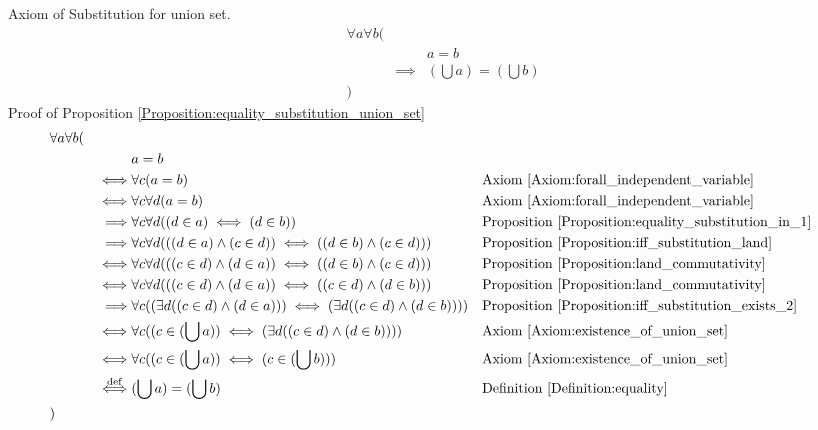 \begin{prop}
\label{Proposition:equality_substitution_union_set}
Axiom of Substitution for union set.
\begin{align*}
& \forall a \forall b ( \\
& & & a = b \\
& & \implies & (\bigcup a) = (\bigcup b) \\
& )
\end{align*}
Proof of Proposition \ref{Proposition:equality_substitution_union_set}
\begin{align*}
& \forall a \forall b ( \\
& & & a = b \\
& & \iff & \forall c (a = b)
& & \text{Axiom \ref{Axiom:forall_independent_variable}} \\
& & \iff & \forall c \forall d (a = b)
& & \text{Axiom \ref{Axiom:forall_independent_variable}} \\
& & \implies & \forall c \forall d ((d \in a) \iff (d \in b))
& & \text{Proposition \ref{Proposition:equality_substitution_in_1}} \\
& & \implies & \forall c \forall d (((d \in a) \land (c \in d)) \iff ((d \in b) \land (c \in d)))
& & \text{Proposition \ref{Proposition:iff_substitution_land}} \\
& & \iff & \forall c \forall d (((c \in d) \land (d \in a)) \iff ((d \in b) \land (c \in d)))
& & \text{Proposition \ref{Proposition:land_commutativity}} \\
& & \iff & \forall c \forall d (((c \in d) \land (d \in a)) \iff ((c \in d) \land (d \in b)))
& & \text{Proposition \ref{Proposition:land_commutativity}} \\
& & \implies & \forall c ((\exists d ((c \in d) \land (d \in a))) \iff (\exists d ((c \in d) \land (d \in b))))
& & \text{Proposition \ref{Proposition:iff_substitution_exists_2}} \\
& & \iff & \forall c ((c \in (\bigcup a)) \iff (\exists d ((c \in d) \land (d \in b))))
& & \text{Axiom \ref{Axiom:existence_of_union_set}} \\
& & \iff & \forall c ((c \in (\bigcup a)) \iff (c \in (\bigcup b)))
& & \text{Axiom \ref{Axiom:existence_of_union_set}} \\
& & \overset{\operatorname{def}}{\iff} & (\bigcup a) = (\bigcup b)
& & \text{Definition \ref{Definition:equality}} \\
& )
\end{align*}
\end{prop}

